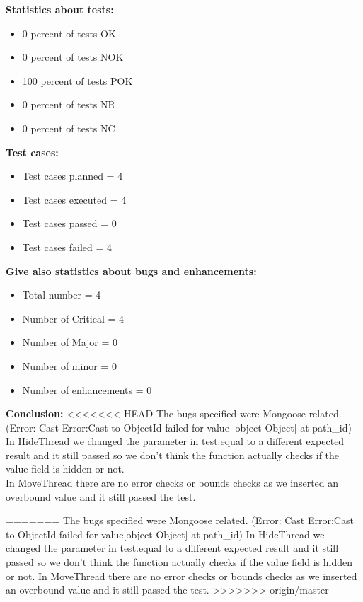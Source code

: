 \begin{flushleft}
\begin{flushleft}
\textbf{Statistics about tests:}
\begin{itemize}
  	\item  0 percent of tests OK
  	\item  0 percent of tests NOK
   	\item 100 percent of tests POK
    	\item 	0 percent of tests NR
        	\item 	0 percent of tests NC
 \end{itemize}

\textbf{Test cases:}
\begin{itemize}
  	\item Test cases planned = 4 
  	\item  Test cases executed = 4
   	\item Test cases passed = 0
    	\item Test cases failed = 4
 \end{itemize}

\textbf{Give also statistics about bugs and enhancements:}
\begin{itemize}
  	\item 	Total number = 4
  	\item  	Number of Critical = 4
   	\item 	Number of Major = 0
    	\item Number of minor = 0
      	\item Number of enhancements = 0
 \end{itemize}
 \end{flushleft}
 
\begin{flushleft}
\textbf{Conclusion:}
<<<<<<< HEAD
The bugs specified were Mongoose related. (Error: Cast Error:Cast to ObjectId failed for value [object Object] at path\_id)\\
In HideThread we changed the parameter in test.equal to a different expected result and it still passed so we don’t think the function actually checks if the value field is hidden or not.\\
In MoveThread there are no error checks or bounds checks as we inserted an overbound value and it still passed the test.
\end{flushleft}
=======
The bugs specified were Mongoose related. (Error: Cast Error:Cast to ObjectId failed for value[object Object] at path\_id)
In HideThread we changed the parameter in test.equal to a different expected result and it still passed so we don’t think the function actually checks if the value field is hidden or not.
In MoveThread there are no error checks or bounds checks as we inserted an overbound value and it still passed the test. 
>>>>>>> origin/master

\end{flushleft}

